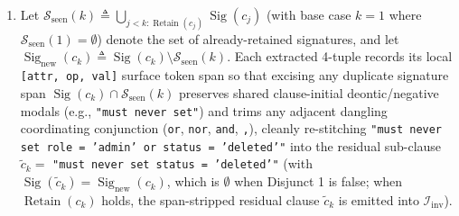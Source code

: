 \documentclass[conference,10pt]{IEEEtran}
\begin{document}
\begin{enumerate}
    \item Let $\mathcal{S}_{\text{seen}}(k) \triangleq \bigcup_{j < k : \operatorname{Retain}(c_j)} \operatorname{Sig}(c_j)$ (with base case $k = 1$ where $\mathcal{S}_{\text{seen}}(1) = \emptyset$) denote the set of already-retained signatures, and let $\operatorname{Sig}_{\text{new}}(c_k) \triangleq \operatorname{Sig}(c_k) \setminus \mathcal{S}_{\text{seen}}(k)$. Each extracted 4-tuple records its local \texttt{[attr, op, val]} surface token span so that excising any duplicate signature span $\operatorname{Sig}(c_k) \cap \mathcal{S}_{\text{seen}}(k)$ preserves shared clause-initial deontic/negative modals (e.g., \texttt{"must never set"}) and trims any adjacent dangling coordinating conjunction (\texttt{or}, \texttt{nor}, \texttt{and}, \texttt{,}), cleanly re-stitching \texttt{"must never set role = 'admin' or status = 'deleted'"} into the residual sub-clause $\tilde{c}_k =$ \texttt{"must never set status = 'deleted'"} (with $\operatorname{Sig}(\tilde{c}_k) = \operatorname{Sig}_{\text{new}}(c_k)$, which is $\emptyset$ when Disjunct 1 is false; when $\operatorname{Retain}(c_k)$ holds, the span-stripped residual clause $\tilde{c}_k$ is emitted into $\mathcal{I}_{\text{inv}}$).
\end{enumerate}
\end{document}

